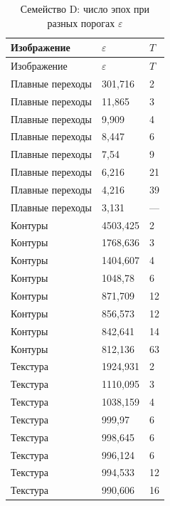 \begin{longtable}{@{}lll@{}}
\caption{Семейство D: число эпох при разных порогах $\varepsilon$}\label{tab:family-d}\\
\hline
Изображение & $\varepsilon$ & $T$ \\
\hline
\endfirsthead
\hline
Изображение & $\varepsilon$ & $T$ \\
\hline
\endhead
Плавные переходы & 301{,}716 & 2 \\
Плавные переходы & 11{,}865 & 3 \\
Плавные переходы & 9{,}909 & 4 \\
Плавные переходы & 8{,}447 & 6 \\
Плавные переходы & 7{,}54 & 9 \\
Плавные переходы & 6{,}216 & 21 \\
Плавные переходы & 4{,}216 & 39 \\
Плавные переходы & 3{,}131 & --- \\
\hline
Контуры & 4503{,}425 & 2 \\
Контуры & 1768{,}636 & 3 \\
Контуры & 1404{,}607 & 4 \\
Контуры & 1048{,}78 & 6 \\
Контуры & 871{,}709 & 12 \\
Контуры & 856{,}573 & 12 \\
Контуры & 842{,}641 & 14 \\
Контуры & 812{,}136 & 63 \\
\hline
Текстура & 1924{,}931 & 2 \\
Текстура & 1110{,}095 & 3 \\
Текстура & 1038{,}159 & 4 \\
Текстура & 999{,}97 & 6 \\
Текстура & 998{,}645 & 6 \\
Текстура & 996{,}124 & 6 \\
Текстура & 994{,}533 & 12 \\
Текстура & 990{,}606 & 16 \\
\hline
\end{longtable}
